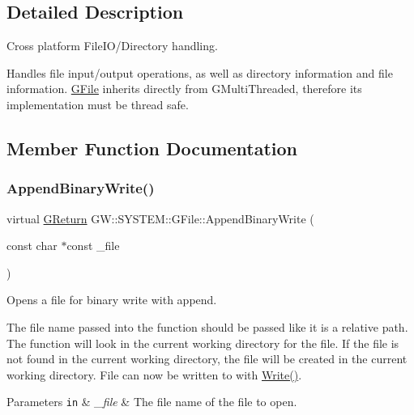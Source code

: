 \subsection{Detailed Description}
Cross platform File\+I\+O/\+Directory handling. 

Handles file input/output operations, as well as directory information and file information. \hyperlink{classGW_1_1SYSTEM_1_1GFile}{G\+File} inherits directly from G\+Multi\+Threaded, therefore its implementation must be thread safe. 

\subsection{Member Function Documentation}
\mbox{\label{classGW_1_1SYSTEM_1_1GFile_a63311236692181f99fd393fe8e1ca9fc}} 
\subsubsection{\texorpdfstring{Append\+Binary\+Write()}{AppendBinaryWrite()}}
{\footnotesize\ttfamily virtual \hyperlink{namespaceGW_a67a839e3df7ea8a5c5686613a7a3de21}{G\+Return} G\+W\+::\+S\+Y\+S\+T\+E\+M\+::\+G\+File\+::\+Append\+Binary\+Write (\begin{DoxyParamCaption}\item[{const char $\ast$const}]{\+\_\+file }\end{DoxyParamCaption})\hspace{0.3cm}{\ttfamily [pure virtual]}}



Opens a file for binary write with append. 

The file name passed into the function should be passed like it is a relative path. The function will look in the current working directory for the file. If the file is not found in the current working directory, the file will be created in the current working directory. File can now be written to with \hyperlink{classGW_1_1SYSTEM_1_1GFile_ae9906414c159e9f1156b5ff6ad511c31}{Write()}.


\begin{DoxyParams}[1]{Parameters}
\mbox{\tt in}  & {\em \+\_\+file} & The file name of the file to open.\\
\hline
\end{DoxyParams}

